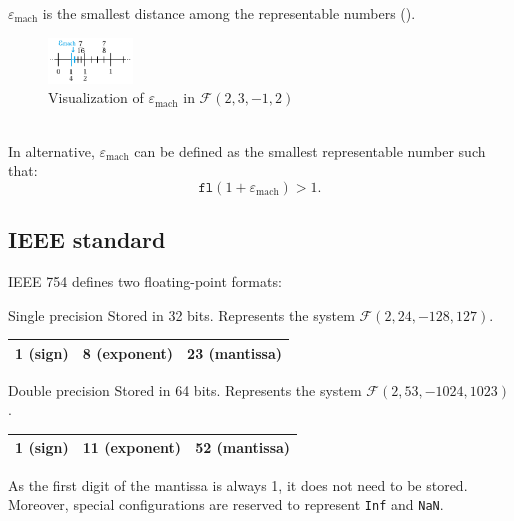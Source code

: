 $\varepsilon_{\text{mach}}$ is the smallest distance among the representable numbers ().
\begin{figure}[h]
    \centering
    \includegraphics[width=0.2\textwidth]{img/machine_eps.png}
    \caption{Visualization of $\varepsilon_{\text{mach}}$ in $\mathcal{F}(2, 3, -1, 2)$}
    \label{fig:finnum_eps}
\end{figure}\\
%
In alternative, $\varepsilon_{\text{mach}}$ can be defined as the smallest representable number such that:
\begin{equation*}
    \texttt{fl}(1 + \varepsilon_{\text{mach}}) > 1.
\end{equation*}


\subsection{IEEE standard}
IEEE 754 defines two floating-point formats:
\begin{descriptionlist}
    \item[Single precision] Stored in 32 bits. Represents the system $\mathcal{F}(2, 24, -128, 127)$. 
        \begin{center}
            \small
            \begin{tabular}{|c|c|c|}
                \hline
                1 (sign) & 8 (exponent) & 23 (mantissa) \\
                \hline
            \end{tabular}
        \end{center}

    \item[Double precision] Stored in 64 bits. Represents the system $\mathcal{F}(2, 53, -1024, 1023)$. 
        \begin{center}
            \small
            \begin{tabular}{|c|c|c|}
                \hline
                1 (sign) & 11 (exponent) & 52 (mantissa) \\
                \hline
            \end{tabular}
        \end{center}
\end{descriptionlist}
As the first digit of the mantissa is always 1, it does not need to be stored.
Moreover, special configurations are reserved to represent \texttt{Inf} and \texttt{NaN}.


